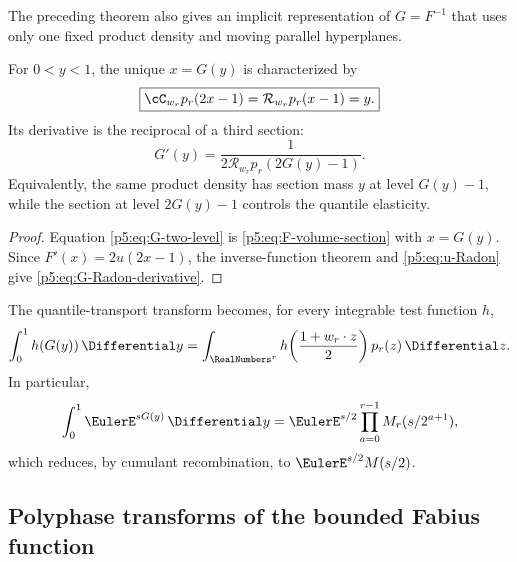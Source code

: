 \documentclass[11pt]{article}
\theoremstyle{definition}
\theoremstyle{remark}
\newcommand{\cR}{\mathcal R}
\begin{document}
The preceding theorem also gives an implicit representation of $G=F^{-1}$ that
uses only one fixed product density and moving parallel hyperplanes.

\begin{corollary}
\label{p5:cor:inverse-geometry}
For $0<y<1$, the unique $x=G(y)$ is characterized by
\begin{equation}
 \boxed{\displaystyle
 \cC_{w_r}p_r(2x-1)=\cR_{w_r}p_r(x-1)=y.}                 \label{p5:eq:G-two-level}
\end{equation}
Its derivative is the reciprocal of a third section:
\begin{equation}
 \boxed{\displaystyle
 G'(y)=\frac1{2\cR_{w_r}p_r(2G(y)-1)}.}                   \label{p5:eq:G-Radon-derivative}
\end{equation}
Equivalently, the same product density has section mass $y$ at level $G(y)-1$,
while the section at level $2G(y)-1$ controls the quantile elasticity.
\end{corollary}

\begin{proof}
Equation \eqref{p5:eq:G-two-level} is \eqref{p5:eq:F-volume-section} with $x=G(y)$.
Since $F'(x)=2u(2x-1)$, the inverse-function theorem and
\eqref{p5:eq:u-Radon} give \eqref{p5:eq:G-Radon-derivative}.
\end{proof}

The quantile-transport transform becomes, for every integrable test function
$h$,
\begin{equation}
 \int_0^1h(G(y))\,\Differential y
 =\int_{\RealNumbers^r}h\!\left(\frac{1+w_r\cdot z}{2}\right)
   p_r(z)\,\Differential z.                                         \label{p5:eq:G-product-cube}
\end{equation}
In particular,
\begin{equation}
 \int_0^1\EulerE^{sG(y)}\,\Differential y
 =\EulerE^{s/2}\prod_{a=0}^{r-1}M_r(s/2^{a+1}),                \label{p5:eq:G-polyphase-MGF}
\end{equation}
which reduces, by cumulant recombination, to
$\EulerE^{s/2}M(s/2)$.

\subsection{Polyphase transforms of the bounded Fabius function}
\end{document}
